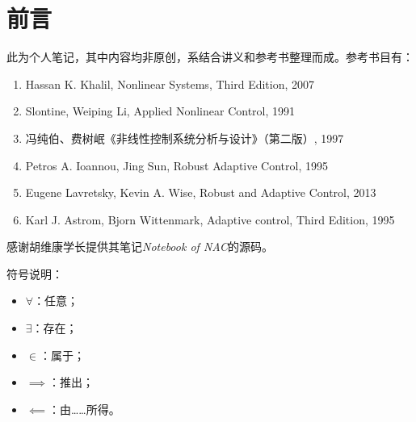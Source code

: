 \chapter*{前言}
此为个人笔记，其中内容均非原创，系结合讲义和参考书整理而成。参考书目有：
\begin{enumerate}
    \item Hassan K. Khalil, Nonlinear Systems, Third Edition, 2007
    \item Slontine, Weiping Li, Applied   Nonlinear    Control, 1991
    \item 冯纯伯、费树岷《非线性控制系统分析与设计》（第二版）, 1997
    \item Petros A. Ioannou, Jing Sun, Robust Adaptive Control, 1995
    \item Eugene Lavretsky, Kevin A. Wise, Robust and Adaptive Control, 2013
    \item Karl J. Astrom, Bjorn Wittenmark, Adaptive control, Third Edition, 1995
\end{enumerate}

感谢胡维康学长提供其笔记{\it Notebook of NAC}的源码。

符号说明：
\begin{itemize}
    \item $\forall$：任意；
    \item $\exists$：存在；
    \item $\in$：属于；
    \item $\implies$：推出；
    \item $\impliedby$：由……所得。
\end{itemize}
